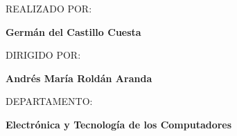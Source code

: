 \begin{center}
REALIZADO POR:
\par\end{center}

\begin{center}
\textbf{Germán del Castillo Cuesta}
\par\end{center}

\begin{center}
DIRIGIDO POR:
\par\end{center}

\begin{center}
\textbf{Andrés María Roldán Aranda}
\par\end{center}

\begin{center}
DEPARTAMENTO:
\par\end{center}

\begin{center}
\textbf{Electrónica y Tecnología de los Computadores}
\par\end{center}

\begin{center}
\vfill 
\par\end{center}



\vspace*{1.5cm}

\newpage
\thispagestyle{empty}

~

